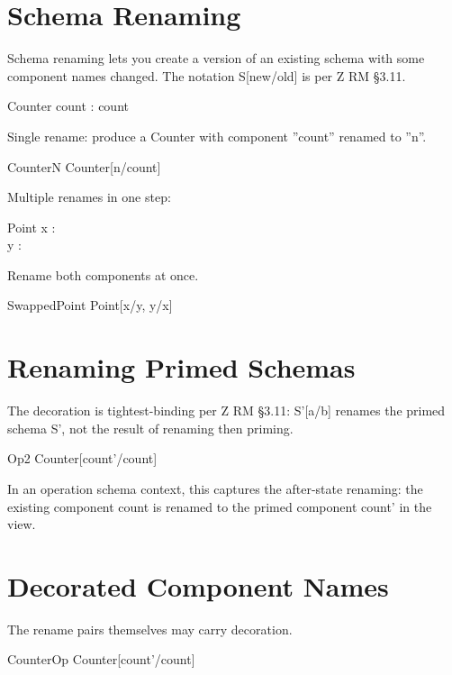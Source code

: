 \documentclass[a4paper,10pt,fleqn]{article}
\begin{document}
\section*{Schema Renaming}

\noindent Schema renaming lets you create a version of an existing schema with some component names changed.  The notation S[new/old] is per Z RM §3.11.

\bigskip

\begin{schema}{Counter}
count : \nat
\where
count 
\end{schema}

\noindent Single rename: produce a Counter with component ''count'' renamed to ''n''.

\bigskip

\begin{zed}
CounterN  Counter[n/count]
\end{zed}

\noindent Multiple renames in one step:

\bigskip

\begin{schema}{Point}
x : \nat \\
y : \nat
\end{schema}

\noindent Rename both components at once.

\bigskip

\begin{zed}
SwappedPoint  Point[x/y, y/x]
\end{zed}

\section*{Renaming Primed Schemas}

\noindent The decoration is tightest-binding per Z RM §3.11: S'[a/b] renames the primed schema S', not the result of renaming then priming.

\bigskip

\begin{zed}
Op2  Counter[count'/count]
\end{zed}

\noindent In an operation schema context, this captures the after-state renaming: the existing component count is renamed to the primed component count' in the view.

\bigskip

\section*{Decorated Component Names}

\noindent The rename pairs themselves may carry decoration.

\bigskip

\begin{zed}
CounterOp  Counter[count'/count]
\end{zed}
\end{document}
